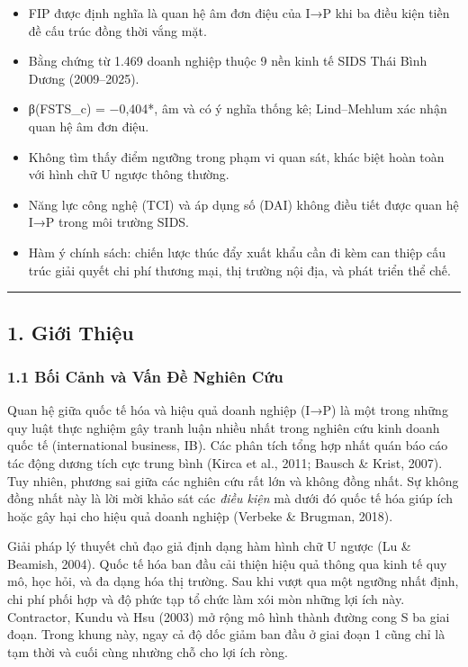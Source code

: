 \documentclass[12pt,a4paper]{article}
\providecommand{\tightlist}{\setlength{\itemsep}{0pt}\setlength{\parskip}{0pt}}
\begin{document}
\begin{itemize}
\tightlist
\item
  FIP được định nghĩa là quan hệ âm đơn điệu của I→P khi ba điều kiện
  tiền đề cấu trúc đồng thời vắng mặt.
\item
  Bằng chứng từ 1.469 doanh nghiệp thuộc 9 nền kinh tế SIDS Thái Bình
  Dương (2009--2025).
\item
  β(FSTS\_c) = −0,404*, âm và có ý nghĩa thống kê; Lind--Mehlum xác nhận
  quan hệ âm đơn điệu.
\item
  Không tìm thấy điểm ngưỡng trong phạm vi quan sát, khác biệt hoàn toàn
  với hình chữ U ngược thông thường.
\item
  Năng lực công nghệ (TCI) và áp dụng số (DAI) không điều tiết được quan
  hệ I→P trong môi trường SIDS.
\item
  Hàm ý chính sách: chiến lược thúc đẩy xuất khẩu cần đi kèm can thiệp
  cấu trúc giải quyết chi phí thương mại, thị trường nội địa, và phát
  triển thể chế.
\end{itemize}

\begin{center}\rule{0.5\linewidth}{0.5pt}\end{center}

\hypertarget{1-giux1edbi-thiux1ec7u}{%
\subsection{1. Giới Thiệu}\label{1-giux1edbi-thiux1ec7u}}

\hypertarget{11-bux1ed1i-cux1ea3nh-vuxe0-vux1ea5n-ux111ux1ec1-nghiuxean-cux1ee9u}{%
\subsubsection{1.1 Bối Cảnh và Vấn Đề Nghiên
Cứu}\label{11-bux1ed1i-cux1ea3nh-vuxe0-vux1ea5n-ux111ux1ec1-nghiuxean-cux1ee9u}}

Quan hệ giữa quốc tế hóa và hiệu quả doanh nghiệp (I→P) là một trong
những quy luật thực nghiệm gây tranh luận nhiều nhất trong nghiên cứu
kinh doanh quốc tế (international business, IB). Các phân tích tổng hợp
nhất quán báo cáo tác động dương tích cực trung bình (Kirca et al.,
2011; Bausch \& Krist, 2007). Tuy nhiên, phương sai giữa các nghiên cứu
rất lớn và không đồng nhất. Sự không đồng nhất này là lời mời khảo sát
các \emph{điều kiện} mà dưới đó quốc tế hóa giúp ích hoặc gây hại cho
hiệu quả doanh nghiệp (Verbeke \& Brugman, 2018).

Giải pháp lý thuyết chủ đạo giả định dạng hàm hình chữ U ngược (Lu \&
Beamish, 2004). Quốc tế hóa ban đầu cải thiện hiệu quả thông qua kinh tế
quy mô, học hỏi, và đa dạng hóa thị trường. Sau khi vượt qua một ngưỡng
nhất định, chi phí phối hợp và độ phức tạp tổ chức làm xói mòn những lợi
ích này. Contractor, Kundu và Hsu (2003) mở rộng mô hình thành đường
cong S ba giai đoạn. Trong khung này, ngay cả độ dốc giảm ban đầu ở giai
đoạn 1 cũng chỉ là tạm thời và cuối cùng nhường chỗ cho lợi ích ròng.
\end{document}
